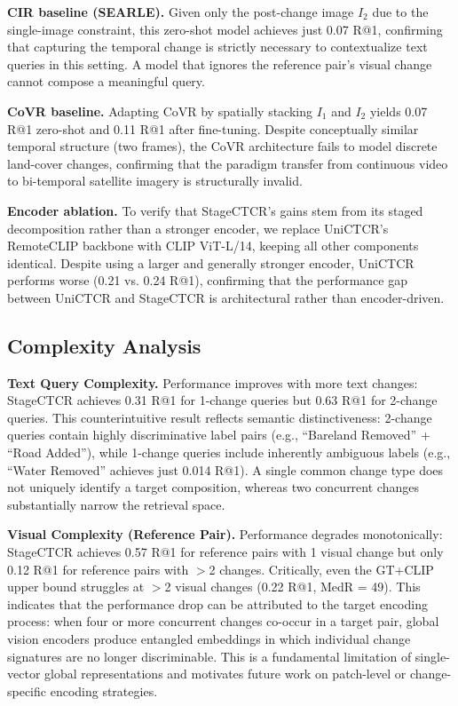 \textbf{CIR baseline (SEARLE).} Given only the
post-change image $I_2$ due to the single-image constraint,
this zero-shot model achieves just 0.07 R@1, confirming
that capturing the temporal change is strictly necessary
to contextualize text queries in this setting. A model
that ignores the reference pair's visual change cannot
compose a meaningful query.
 
\textbf{CoVR baseline.} Adapting CoVR by spatially stacking
$I_1$ and $I_2$ yields 0.07 R@1 zero-shot and 0.11 R@1
after fine-tuning. Despite conceptually similar temporal
structure (two frames), the CoVR architecture fails to
model discrete land-cover changes, confirming that
the paradigm transfer from continuous video to bi-temporal
satellite imagery is structurally invalid.
 
\textbf{Encoder ablation.} To verify that StageCTCR's gains
stem from its staged decomposition rather than a stronger
encoder, we replace UniCTCR's RemoteCLIP backbone with
CLIP ViT-L/14, keeping all other components identical.
Despite using a larger and generally stronger encoder,
UniCTCR performs worse (0.21 vs. 0.24 R@1), confirming
that the performance gap between UniCTCR and StageCTCR is
architectural rather than encoder-driven.
 
\subsection{Complexity Analysis}
\label{sec:chap7_complexity}
 
\textbf{Text Query Complexity.} Performance improves with
more text changes: StageCTCR achieves 0.31 R@1 for
1-change queries but 0.63 R@1 for 2-change queries. This
counterintuitive result reflects semantic distinctiveness:
2-change queries contain highly discriminative label pairs
(e.g., ``Bareland Removed'' + ``Road Added''), while
1-change queries include inherently ambiguous labels
(e.g., ``Water Removed'' achieves just 0.014 R@1). A
single common change type does not uniquely identify a
target composition, whereas two concurrent changes
substantially narrow the retrieval space.
 
\textbf{Visual Complexity (Reference Pair).} Performance
degrades monotonically: StageCTCR achieves 0.57 R@1 for
reference pairs with 1 visual change but only 0.12 R@1
for reference pairs with $>$2 changes. Critically, even
the GT+CLIP upper bound struggles at $>$2 visual changes
(0.22 R@1, MedR = 49). This indicates that the performance
drop can be attributed to the target encoding process:
when four or more concurrent changes co-occur in a target
pair, global vision encoders produce entangled embeddings
in which individual change signatures are no longer
discriminable. This is a fundamental limitation of
single-vector global representations and motivates future
work on patch-level or change-specific encoding strategies.
 
